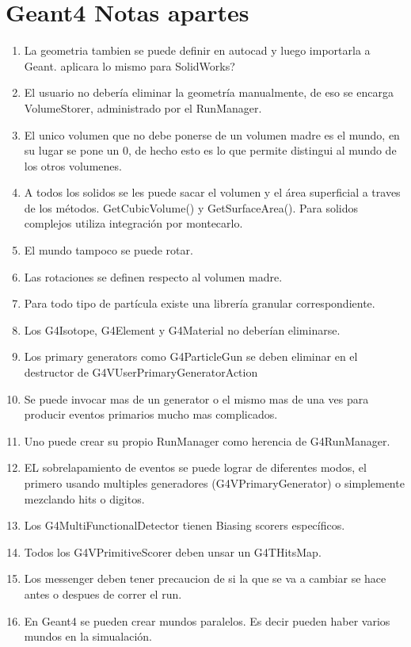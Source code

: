 \documentclass[10pt,a4paper,oneside]{book}
\begin{document}
\section*{Geant4 Notas apartes}
\begin{enumerate}
\item La geometria tambien se puede definir en autocad y luego
  importarla a Geant. aplicara lo mismo para SolidWorks?
\item El usuario no debería eliminar la geometría manualmente, de eso
  se encarga VolumeStorer, administrado por el RunManager.
\item El unico volumen que no debe ponerse de un volumen madre es el
  mundo, en su lugar se pone un 0, de hecho esto es lo que permite
  distingui al mundo de los otros volumenes.
\item A todos los solidos se les puede sacar el volumen y el área
  superficial a traves de los métodos. GetCubicVolume() y
  GetSurfaceArea(). Para solidos complejos utiliza integración por
  montecarlo.
\item El mundo tampoco se puede rotar.
\item Las rotaciones se definen respecto al volumen madre.
\item Para todo tipo de partícula existe una librería granular
  correspondiente.
\item Los G4Isotope, G4Element y G4Material no deberían eliminarse.
\item Los primary generators como G4ParticleGun se deben eliminar en
  el destructor de G4VUserPrimaryGeneratorAction
\item Se puede invocar mas de un generator o el mismo mas de una ves
  para producir eventos primarios mucho mas complicados.
\item Uno puede crear su propio RunManager como herencia de
  G4RunManager.
\item EL sobrelapamiento de eventos se puede lograr de diferentes
  modos, el primero usando multiples generadores (G4VPrimaryGenerator)
  o simplemente mezclando hits o digitos.
\item Los G4MultiFunctionalDetector tienen Biasing scorers específicos.
\item Todos los G4VPrimitiveScorer deben unsar un G4THitsMap.
\item Los messenger deben tener precaucion de si la que se va a
  cambiar se hace antes o despues de correr el run.
\item En Geant4 se pueden crear mundos paralelos. Es decir pueden
  haber varios mundos en la simualación.

\end{enumerate}
\end{document}
